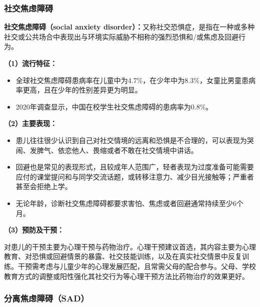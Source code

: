 \subsubsection{社交焦虑障碍}

\begin{keybox}
\textbf{社交焦虑障碍（social anxiety disorder）：}又称社交恐惧症，是指在一种或多种社交或公共场合中表现出与环境实际威胁不相称的强烈恐惧和/或焦虑及回避行为。

\vspace{4pt}
\textbf{（1）流行特征：}

\begin{itemize}[leftmargin=*]
    \item 全球社交焦虑障碍患病率在儿童中为4.7\%，在少年中为8.3\%，女童比男童患病率更高，且在少年的性别差异更为明显。
    \item 2020年调查显示，中国在校学生社交焦虑障碍的患病率为0.8\%。
\end{itemize}

\vspace{4pt}
\textbf{（2）主要表现：}

\begin{itemize}[leftmargin=*]
    \item 患儿往往很少认识到自己对社交情境的远离和恐惧是不合理的，可以表现为哭闹、发脾气、依恋他人、畏缩或者不敢在社交情境中讲话。
    \item 回避也是常见的表现形式，且较成年人范围广，轻者表现为过度准备可能需要应付的课堂提问和与同学交流话题，或转移注意力、减少目光接触等；严重者甚至会拒绝上学。
    \item 无论年龄，诊断社交焦虑障碍都要求害怕、焦虑或者回避通常持续至少6个月。
\end{itemize}

\vspace{4pt}
\textbf{（3）预防及干预：}

对患儿的干预主要为心理干预与药物治疗。心理干预建议首选，其内容主要为心理教育、对恐惧或回避情景的暴露、社交技能训练，以及在真实社交情景中反复训练。干预需考虑与儿童少年的心理发展匹配，且常需父母的配合参与。父母、学校教育方式的调整或阳性强化其社交行为等心理干预方法比药物治疗的效果更好。
\end{keybox}

\subsubsection{分离焦虑障碍（SAD）}


